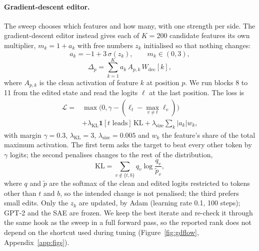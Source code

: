 \documentclass[11pt,twocolumn]{article}
\newcommand{\Dp}{\Delta_p}
\newcommand{\Wdec}{W_{\mathrm{dec}}}
\begin{document}
\paragraph{Gradient-descent editor.} The sweep chooses which features and how many, with one strength per side. The gradient-descent editor instead gives each of $K=200$ candidate features its own multiplier, $m_k=1+a_k$ with free numbers $z_k$ initialised so that nothing changes:
\begin{equation}\label{eq:a}
a_k=-1+3\,\sigma(z_k),\qquad m_k\in(0,3),
\end{equation}
\begin{equation}\label{eq:gdedit}
\Dp=\sum_{k=1}^{K}a_k\,A_{p,k}\,\Wdec[k],
\end{equation}
where $A_{p,k}$ is the clean activation of feature $k$ at position $p$. We run blocks 8 to 11 from the edited state and read the logits $\ell$ at the last position. The loss is
\begin{equation}\label{eq:loss}
\begin{aligned}
\mathcal{L}={}&\max\!\bigl(0,\gamma-(\ell_t-\max_{v\ne t}\ell_v)\bigr)\\
&+\lambda_{\mathrm{KL}}\mathbf{1}[\text{$t$ leads}]\,\mathrm{KL}+\lambda_{\mathrm{size}}\sum_k|a_k|w_k,
\end{aligned}
\end{equation}
with margin $\gamma=0.3$, $\lambda_{\mathrm{KL}}=3$, $\lambda_{\mathrm{size}}=0.005$ and $w_k$ the feature's share of the total maximum activation. The first term asks the target to beat every other token by $\gamma$ logits; the second penalises changes to the rest of the distribution,
\begin{equation}\label{eq:kl}
\mathrm{KL}=\sum_{v\notin\{t,b\}}q_v\log\frac{q_v}{\tilde p_v},
\end{equation}
where $q$ and $\tilde p$ are the softmax of the clean and edited logits restricted to tokens other than $t$ and $b$, so the intended change is not penalised; the third prefers small edits. Only the $z_k$ are updated, by Adam \citep{kingma2015} (learning rate 0.1, 100 steps); GPT-2 and the SAE are frozen. We keep the best iterate and re-check it through the same hook as the sweep in a full forward pass, so the reported rank does not depend on the shortcut used during tuning (Figure~\ref{fig:gdflow}, Appendix~\ref{app:figs}).
\end{document}
